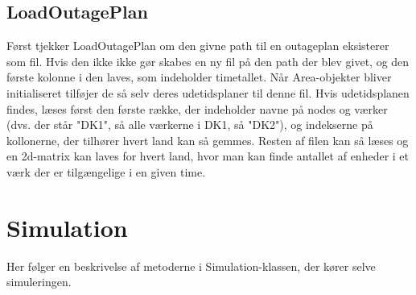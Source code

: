 \documentclass{article}
\begin{document}
\subsection{LoadOutagePlan}
Først tjekker LoadOutagePlan om den givne path til en outageplan eksisterer som fil. Hvis den ikke ikke gør skabes en ny fil på den path der blev givet, og den første kolonne i den laves, som indeholder timetallet. Når Area-objekter bliver initialiseret tilføjer de så selv deres udetidsplaner til denne fil.
Hvis udetidsplanen findes, læses først den første række, der indeholder navne på nodes og værker (dvs. der står "DK1", så alle værkerne i DK1, så "DK2"), og indekserne på kollonerne, der tilhører hvert land kan så gemmes. Resten af filen kan så læses og en 2d-matrix kan laves for hvert land, hvor man kan finde antallet af enheder i et værk der er tilgængelige i en given time. 


\section{Simulation}
Her følger en beskrivelse af metoderne i Simulation-klassen, der kører selve simuleringen.
\end{document}
